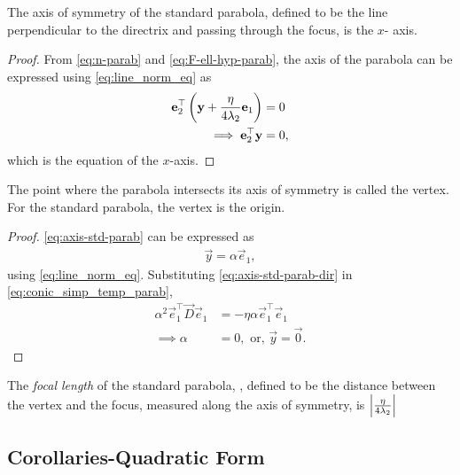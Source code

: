 \documentclass[journal,12pt,onecolumn]{IEEEtran}
\begin{document}
	\begin{corollary}
			The axis of symmetry of the standard parabola, defined to be the line perpendicular to the directrix and passing through the focus,  is the $x$- axis.
	\end{corollary}
	\begin{proof}
	From \eqref{eq:n-parab} and 	
					\eqref{eq:F-ell-hyp-parab}, 
					the axis of the parabola  can be expressed using 
    \eqref{eq:line_norm_eq} as 
		\begin{align}
			\mathbf{e}_2^{\top}\left(\mathbf{y}  
			+\frac{\eta}{4\lambda_2}\mathbf{e}_1\right) &= 0
			\\
			\implies \mathbf{e}_2^{\top}\mathbf{y} &= 0
					\label{eq:axis-std-parab}, 
		\end{align}
		which is the equation of the $x$-axis.
	\end{proof}


	\begin{corollary}
			\label{corr:center-parab}
 The point where the parabola intersects its axis of symmetry is called the vertex. For the standard parabola, the vertex is the origin.
	\end{corollary}
	\begin{proof}
					\eqref{eq:axis-std-parab} can be expressed as 
    \begin{align}
			\vec{y}= \alpha \vec{e}_1 
					\label{eq:axis-std-parab-dir}, 
    \end{align}
    using 
    \eqref{eq:line_norm_eq}.
					Substituting \eqref{eq:axis-std-parab-dir} in 
    \eqref{eq:conic_simp_temp_parab}, 
    \begin{align}
	     \alpha^2 \vec{e}_1^{\top}\vec{D} \vec{e}_1 &=  -\eta\alpha \vec{e}_1^{\top} \vec{e}_1   
	     \\
	     \implies \alpha &=0, \text{ or, } \vec{y} = \vec{0}.
    \end{align}
	\end{proof}
	\begin{corollary}
			\label{corr:foclen}
	 The {\em focal length} of the standard parabola, , defined to be the distance between the vertex and the focus, measured along the axis of symmetry, is $\left\vert\frac{\eta}{4 \lambda_2}\right\vert$
	\end{corollary}
	\subsection{Corollaries-Quadratic Form }
\end{document}
